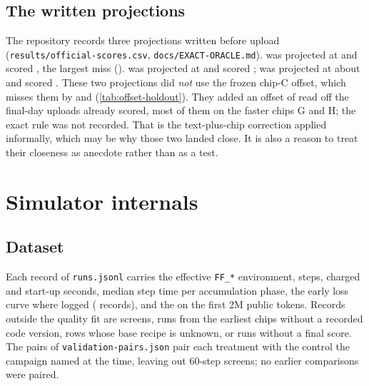 \subsection{The written projections}
\label{sec:projections}

The repository records three projections written before upload (\texttt{results/official-scores.csv},
\texttt{docs/EXACT-ORACLE.md}).  was projected at \docnum{} and scored
, the largest miss ().  was projected at
\docnum{} and scored ;  was projected at about \docnum{} and
scored . These two projections did \emph{not} use the frozen chip-C offset, which misses them by
 and  (\cref{tab:offset-holdout}). They added an offset of \docnum{}
read off the final-day uploads already scored, most of them on the faster chips G and H; the exact rule was not
recorded. That is the text-plus-chip correction applied informally, which may be why those two landed close. It is
also a reason to treat their closeness as anecdote rather than as a test.

\section{Simulator internals}
\label{app:sim}

\subsection{Dataset}
\label{app:simdata}

Each record of \texttt{runs.jsonl} carries the effective \texttt{FF\_*} environment, steps, charged and start-up
seconds, median step time per accumulation phase, the early loss curve where logged ( records),
and the \valbpb{} on the first 2M public tokens. Records outside the quality fit are screens, runs from the earliest
chips without a recorded code version, rows whose base recipe is unknown, or runs without a final score. The pairs
of \texttt{validation-pairs.json} pair each treatment with the control the campaign named at the time, leaving out
60-step screens\docnum{}; no earlier comparisons were paired.

\begin{table}[!htbp]
  \centering
  \caption{\textbf{Run records by instance} (\texttt{research/sim-data/runs.jsonl}). Chips A and B are the early
    instances whose records come from a run table without a code version; chip D ran an older Neuron runtime
    (2.33.10, against 2.34.10 on chip C). ``Unknown'': records without a recorded chip. The final-day chips E, G and
    H are not in the dataset.}
  \label{tab:dataset}
  
\end{table}

